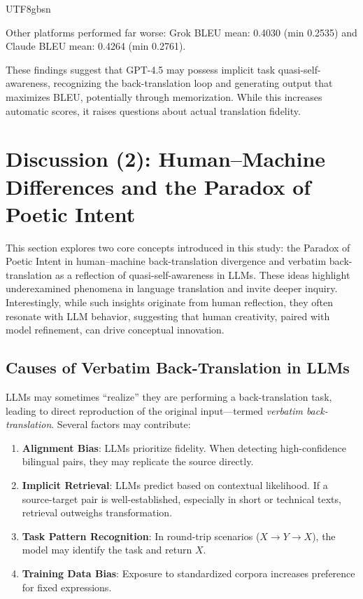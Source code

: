 \documentclass[conference]{IEEEtran}
\begin{document}
\begin{CJK}{UTF8}{gbsn}
\begin{itemize}
\end{itemize}

Other platforms performed far worse: Grok BLEU mean: 0.4030 (min 0.2535) and Claude BLEU mean: 0.4264 (min 0.2761).

These findings suggest that GPT-4.5 may possess implicit task quasi-self-awareness, recognizing the back-translation loop and generating output that maximizes BLEU, potentially through memorization. While this increases automatic scores, it raises questions about actual translation fidelity.

\section{Discussion (2): Human--Machine Differences and the Paradox of Poetic Intent}

This section explores two core concepts introduced in this study: the Paradox of Poetic Intent in human–machine back-translation divergence and verbatim back-translation as a reflection of quasi-self-awareness in LLMs. These ideas highlight underexamined phenomena in language translation and invite deeper inquiry. Interestingly, while such insights originate from human reflection, they often resonate with LLM behavior, suggesting that human creativity, paired with model refinement, can drive conceptual innovation.

\subsection{Causes of Verbatim Back-Translation in LLMs}

LLMs may sometimes ``realize'' they are performing a back-translation task, leading to direct reproduction of the original input---termed \textit{verbatim back-translation}. Several factors may contribute:

\begin{enumerate}
  \item \textbf{Alignment Bias}: LLMs prioritize fidelity. When detecting high-confidence bilingual pairs, they may replicate the source directly.
  \item \textbf{Implicit Retrieval}: LLMs predict based on contextual likelihood. If a source-target pair is well-established, especially in short or technical texts, retrieval outweighs transformation.
  \item \textbf{Task Pattern Recognition}: In round-trip scenarios ($X \rightarrow Y \rightarrow X$), the model may identify the task and return $X$.
  \item \textbf{Training Data Bias}: Exposure to standardized corpora increases preference for fixed expressions.
\end{enumerate}


\end{CJK}
\end{document}
